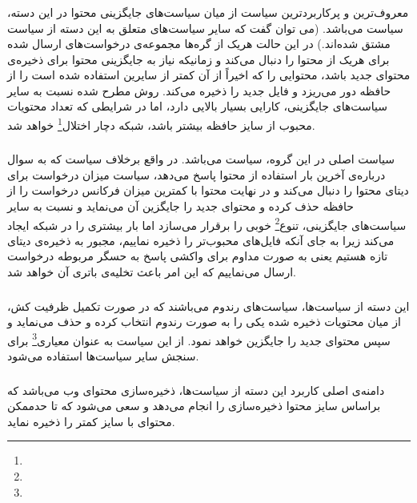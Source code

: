   \subsubsection{}
  معروف‌‌ترین و پرکاربردترین سیاست از میان سیاست‌های جایگزینی محتوا در این دسته، سیاست  می‌باشد. (می توان گفت که سایر سیاست‌های متعلق به این دسته از سیاست  مشتق شده‌اند.) در این حالت هریک از گره‌ها مجموعه‌ی درخواست‌های ارسال شده برای هریک از محتوا را دنبال می‌کند و زمانیکه نیاز به جایگزینی محتوا برای ذخیره‌ی محتوای جدید باشد، محتوایی را که اخیراً از آن کمتر از سایرین استفاده شده است را از حافظه دور می‌ریزد و فایل جدید را ذخیره می‌کند. روش مطرح شده نسبت به سایر سیاست‌های جایگزینی، کارایی بسیار بالایی دارد، اما در شرایطی که تعداد محتویات محبوب از سایز حافظه بیشتر باشد، شبکه دچار اختلال\footnote{} خواهد شد.
  
  \subsubsection{}
  سیاست اصلی در این گروه، سیاست  می‌باشد. در واقع برخلاف سیاست  که به سوال درباره‌ی آخرین بار استفاده از محتوا پاسخ می‌دهد،  سیاست  میزان درخواست برای دیتای محتوا را دنبال می‌کند و در نهایت محتوا با کمترین میزان فرکانس درخواست را از حافظه حذف کرده و محتوای جدید را جایگزین آن می‌نماید و نسبت به سایر سیاست‌های جایگزینی، تنوع\footnote{} خوبی را برقرار می‌سازد اما بار بیشتری را در شبکه ایجاد می‌کند زیرا به جای آنکه فایل‌های محبوب‌تر را ذخیره نماییم، مجبور به ذخیره‌ی دیتای تازه هستیم یعنی به صورت مداوم برای واکشی پاسخ به حسگر مربوطه درخواست ارسال می‌نماییم که این امر باعث تخلیه‌ی باتری آن خواهد شد.
  
  \subsubsection{}
  این دسته از سیاست‌ها، سیاست‌های رندوم می‌باشند که در صورت تکمیل ظرفیت کش، از میان محتویات ذخیره شده یکی را به صورت رندوم انتخاب کرده و حذف می‌نماید و سپس محتوای جدید را جایگزین خواهد نمود. از این سیاست به عنوان معیاری\footnote{} برای سنجش سایر سیاست‌ها استفاده می‌شود.
  
  \subsubsection{}
  دامنه‌ی اصلی کاربرد این دسته از سیاست‌ها، ذخیره‌سازی محتوای وب می‌باشد که براساس سایز محتوا ذخیره‌سازی را انجام می‌دهد و سعی می‌شود که تا حدممکن محتوای با سایز کمتر را ذخیره نماید.
 
